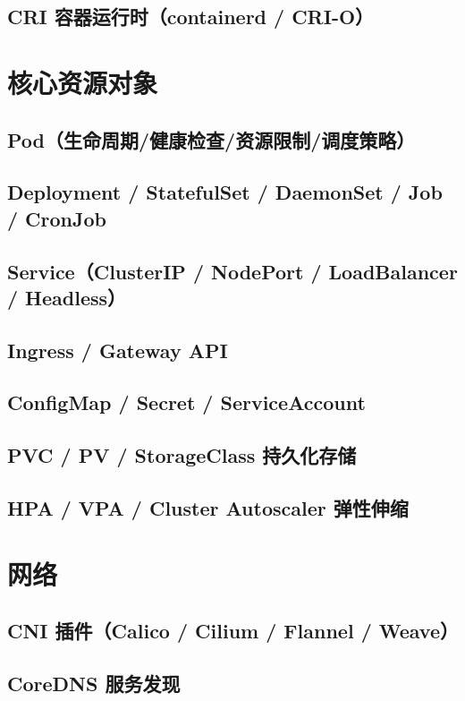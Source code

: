 \documentclass[12pt,UTF8]{ctexbook}
\begin{document}
    \subsection{CRI 容器运行时（containerd / CRI-O）}

  \section{核心资源对象}
    \subsection{Pod（生命周期/健康检查/资源限制/调度策略）}
    \subsection{Deployment / StatefulSet / DaemonSet / Job / CronJob}
    \subsection{Service（ClusterIP / NodePort / LoadBalancer / Headless）}
    \subsection{Ingress / Gateway API}
    \subsection{ConfigMap / Secret / ServiceAccount}
    \subsection{PVC / PV / StorageClass 持久化存储}
    \subsection{HPA / VPA / Cluster Autoscaler 弹性伸缩}

  \section{网络}
    \subsection{CNI 插件（Calico / Cilium / Flannel / Weave）}
    \subsection{CoreDNS 服务发现}
\end{document}
